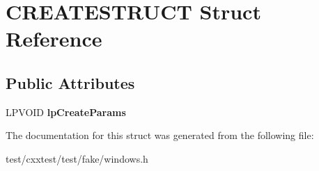 \hypertarget{structCREATESTRUCT}{\section{C\-R\-E\-A\-T\-E\-S\-T\-R\-U\-C\-T Struct Reference}
\label{structCREATESTRUCT}
}
\subsection*{Public Attributes}
\begin{DoxyCompactItemize}
\item 
\hypertarget{structCREATESTRUCT_acf60cd26eeab673292e108e14d47afcf}{L\-P\-V\-O\-I\-D {\bfseries lp\-Create\-Params}}\label{structCREATESTRUCT_acf60cd26eeab673292e108e14d47afcf}

\end{DoxyCompactItemize}


The documentation for this struct was generated from the following file\-:\begin{DoxyCompactItemize}
\item 
test/cxxtest/test/fake/windows.\-h\end{DoxyCompactItemize}
